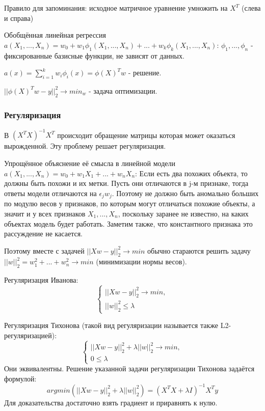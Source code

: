 Правило для запоминания: исходное матричное уравнение умножить на $X^T$ (слева и справа)

Обобщённая линейная регрессия $a(X_1, ..., X_n) = w_0 + w_1\phi_1(X_1, ..., X_n) + ... + w_k\phi_k(X_1, ..., X_n)$:
$\phi_1, ..., \phi_n$ - фиксированные базисные функции, не зависят от данных.

$a(x) = \sum\limits_{i=1}^k w_i\phi_i(x) = \phi(X)^Tw$ - решение.

$||\phi(X)^Tw - y||_2^2 \rightarrow min_w$ - задача оптимизации.

\subsubsection{Регуляризация}
В $(X^TX)^{-1}X^T$ происходит обращение матрицы которая может оказаться вырожденной. Эту проблему решает регуляризация.

Упрощённое объяснение её смысла в линейной модели
$a(X_1, ..., X_n) = w_0 + w_1X_1 + ... + w_nX_n$:
Если есть два похожих объекта, то должны быть похожи и их
метки. Пусть они отличаются в j-м признаке, тогда ответы модели отличаются
на $\epsilon_jw_j$. Поэтому не должно быть аномально больших по модулю весов
у признаков, по которым могут отличаться похожие объекты, а значит и у всех
признаков $X_1, ..., X_n$, поскольку заранее не известно, на каких объектах модель
будет работать. Заметим также, что константного признака это рассуждение не
касается.


Поэтому вместе с задачей
$|| Xw - y ||_2^2 \rightarrow min$
обычно стараются решить задачу
$|| w ||_2^2 = w_1^2 + ... + w_n^2 \rightarrow min$
(минимизации нормы весов).

Регуляризация Иванова:
\begin{equation*}
 \begin{cases}
   || Xw - y ||_2^2 \rightarrow min, 
   \\
   || w ||_2^2 \leq \lambda
 \end{cases}
\end{equation*}

Регуляризация Тихонова (такой вид регуляризации называется также L2-регуляризацией):
\begin{equation*}
 \begin{cases}
   || Xw - y ||_2^2 + \lambda|| w ||_2^2 \rightarrow min, 
   \\
   0 \leq \lambda
\end{cases}
\end{equation*}
Они эквивалентны. Решение указанной задачи регуляризации Тихонова задаётся формулой: 
\begin{equation}\label{ss}
argmin(|| Xw - y ||_2^2 + \lambda|| w ||_2^2) = (X^TX + \lambda I)^{-1}X^Ty
\end{equation}
Для доказательства достаточно взять градиент и приравнять к нулю.

